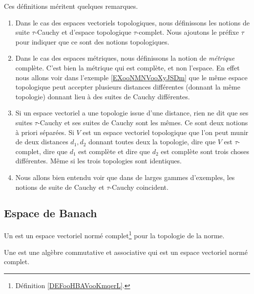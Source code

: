 \begin{normaltext}
	Ces définitions méritent quelques remarques.
	\begin{enumerate}
		\item
		      Dans le cas des espaces vectoriels topologiques, nous définissons les notions de suite \( \tau\)-Cauchy et d'espace topologique \( \tau\)-complet. Nous ajoutons le préfixe \( \tau\) pour indiquer que ce sont des notions topologiques.
		\item
		      Dans le cas des espaces métriques, nous définissons la notion de \emph{métrique} complète. C'est bien la métrique qui est complète, et non l'espace. En effet nous allons voir dans l'exemple \ref{EXooNMNVooXyJSDm} que le même espace topologique peut accepter plusieurs distances différentes (donnant la même topologie) donnant lieu à des suites de Cauchy différentes.
		\item
		      Si un espace vectoriel a une topologie issue d'une distance, rien ne dit que ses suites \( \tau\)-Cauchy et ses suites de Cauchy sont les mêmes. Ce sont deux notions à priori séparées. Si \( V\) est un espace vectoriel topologique que l'on peut munir de deux distances \( d_1, d_2\) donnant toutes deux la topologie, dire que \( V\) est \( \tau\)-complet, dire que \( d_1\) est complète et dire que \( d_2\) est complète sont trois choses différentes. Même si les trois topologies sont identiques.
		\item
		      Nous allons bien entendu voir que dans de larges gammes d'exemples, les notions de suite de Cauchy et \( \tau\)-Cauchy coincident.
	\end{enumerate}
\end{normaltext}

\subsection{Espace de Banach}


\begin{definition}  \label{DefVKuyYpQ}
	Un  est un espace vectoriel normé complet\footnote{Définition \ref{DEFooHBAVooKmqerL}.} pour la topologie de la norme.

	Une  est une algèbre commutative et associative qui est un espace vectoriel normé complet.
\end{definition}


